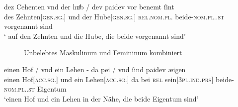 \begin{exe}
\ex \label{ex:iclgr2}
\begin{xlist}
	\ex \label{ex:iclgr2_1}
		\gll %
			dez Cehenten vnd der huͦb / dev paidev {vor benemt} ſint \\
			des Zehnten[\textsc{gen.sg.\MascI}] und der
				Hube[\textsc{gen.sg.\FemI}] {} \textsc{rel.nom.pl.\NeutI}
				beide-\textsc{nom.pl.\NeutI.st} vorgenannt sind \\
			\trans ` auf den Zehnten und die Hube,
				die beide vorgenannt sind'
				\parencites(Nr.~3261, Regensburg, 1299)[424,38--39]{cao4}

	\begin{figure}
	\caption{Unbelebtes Maskulinum und Femininum kombiniert}
	\label{fig:iclgr2_1}
	\end{figure}

	\ex \label{ex:iclgr2_2}
		\gll einen Hof / vnd ein Lehen - da pei / vnd ſind paidev æigen \\
			einen Hof[\textsc{acc.sg.\MascI}] {} und ein
				Lehen[\textsc{acc.sg.\NeutI}] {} da bei {} \textsc{rel}
				sein[\textsc{3pl\subM.ind.prs}] beide-\textsc{nom.pl.\NeutI.st}
				Eigentum \\
			\trans `einen Hof und ein Lehen in der Nähe, die beide Eigentum
				sind'
				\parencites(Nr.~1923, Steyr, 1294)[194,36--37]{cao3}


\end{xlist}
\end{exe}
